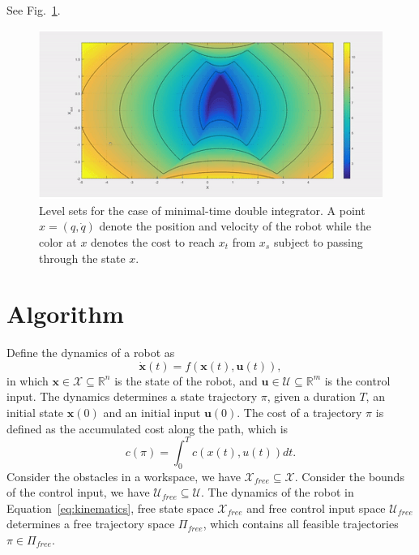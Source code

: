 \documentclass[letterpaper, 10 pt, conference]{ieeeconf}  %
\begin{document}
See Fig.~\ref{fig:informed_1d_di}.
\begin{figure}[tb]
  \centering
  	\includegraphics[height = 4.cm ]{level_set.jpg}
  \caption{
    \captionstyle
  	Level sets for the case of minimal-time double integrator. A point $x = (q, \dot{q})$  denote the position and velocity of the robot while the color at $x$ denotes the cost to reach $x_t$ from $x_s$ subject to passing through the state $x$.
  	}
   	\label{fig:informed_1d_di}
	\vspace{-5.5mm}
\end{figure}



\section{Algorithm}
\label{sec:algorithm}

Define the dynamics of a robot as 
\begin{equation}
\label{eq:kinematics}
\dot{\bm{x}}(t) = f( \bm{x}(t) , \bm{u}(t) ), 
\end{equation}
in which $ \bm{x} \in \mathcal{X} \subseteq \mathbb{R}^n $ is the state of the robot, and $ \bm{u} \in \mathcal{U} \subseteq \mathbb{R}^m $ is the control input.
The dynamics determines a state trajectory $ \pi $, given a duration $ T $, an initial state $ \bm{x}(0) $ and an initial input $ \bm{u}(0) $.
The cost of a trajectory $ \pi $ is defined as the accumulated cost along the path, which is 
\begin{equation}
\label{eq:path_cost}
c(\pi) = \int_0^{T} c( x(t), u(t) ) dt.
\end{equation}
Consider the obstacles in a workspace, we have $ \mathcal{X}_{free} \subseteq \mathcal{X} $.
Consider the bounds of the control input, we have $ \mathcal{U}_{free} \subseteq \mathcal{U} $.
The dynamics of the robot in Equation~\eqref{eq:kinematics}, free state space $  \mathcal{X}_{free} $ and free control input space $ \mathcal{U}_{free} $ determines a free trajectory space $ \Pi_{free} $, which contains all feasible trajectories $ \pi \in \Pi_{free} $.
\end{document}
